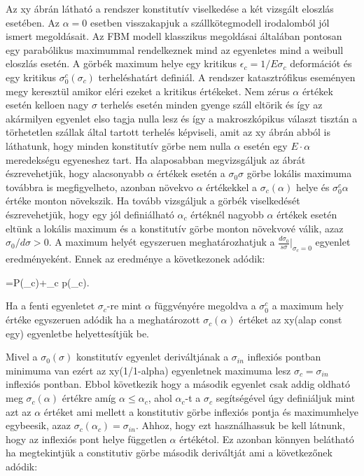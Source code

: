  Az xy ábrán látható a rendszer konstitutív viselkedése a két vizsgált eloszlás esetében. Az $\alpha=0$ esetben visszakapjuk a szállkötegmodell
 irodalomból jól ismert megoldásait. Az FBM modell klasszikus megoldásai általában pontosan egy parabólikus maximummal rendelkeznek mind
 az egyenletes mind a weibull eloszlás esetén. A görbék maximum helye egy kritikus $\epsilon_c=1/E\sigma_c$ deformációt és 
 egy kritikus $\sigma_0^{c}(\sigma_c)$ terheléshatárt definiál. A rendszer katasztrófikus eseményen megy keresztül amikor eléri
 ezeket a kritikus értékeket.
 Nem zérus $\alpha$ értékek esetén kelloen nagy $\sigma$ terhelés esetén minden gyenge száll eltörik és így az akármilyen egyenlet elso tagja 
 nulla lesz és így a makroszkópikus választ tisztán a törhetetlen szállak által tartott terhelés képviseli, amit az xy ábrán
 abból is láthatunk, hogy minden konstitutív görbe nem nulla $\alpha$ esetén egy $E\cdot\alpha$ meredekségu egyeneshez tart.
 Ha alaposabban megvizsgáljuk az ábrát észrevehetjük, hogy alacsonyabb $\alpha$ értékek esetén a $\sigma_0{\sigma}$ görbe lokális maximuma
 továbbra is megfigyelheto, azonban növekvo $\alpha$ értékekkel a $\sigma_c(\alpha)$ helye és $\sigma_0^c{\alpha}$ értéke monton növekszik.
 Ha tovább vizsgáljuk a görbék viselkedését észrevehetjük, hogy egy jól definiálható $\alpha_c$ értéknél nagyobb $\alpha$ értékek
 esetén eltünk a lokális maximum és a konstitutív görbe monton növekvové válik, azaz $\sigma_0/d\sigma>0$. A maximum helyét egyszeruen meghatározhatjuk
 a $\frac{d\sigma_0}{s\sigma}|_{{\sigma_c}=0}$ egyenlet eredményeként. Ennek az eredménye a következonek adódik:

\beq
\label{equ:consti2}
=P(\sigma_c)+\sigma_c p(\sigma_c).
\eeq

 
 Ha a fenti egyenletet $\sigma_c$-re mint $\alpha$ függvényére megoldva a $\sigma_0^c$ a maximum hely értéke egyszeruen adódik ha a meghatározott
 $\sigma_c(\alpha)$ értéket az xy(alap const egy) egyenletbe helyettesítjük be.
 
 Mivel a $\sigma_0(\sigma)$ konstitutív egyenlet deriváltjának a $\sigma_{in}$ inflexiós pontban minimuma van ezért az xy(1/1-alpha) egyenletnek maximuma
 lesz $\sigma_c=\sigma_{in}$ inflexiós pontban. Ebbol következik hogy a második egyenlet csak addig oldható meg $\sigma_c(\alpha)$ értékre
 amíg $\alpha\leq\alpha_c$, ahol $\alpha_c$-t a $\sigma_c$ segítségével úgy definiáljuk mint azt az $\alpha$ értéket ami mellett a konstitutiv görbe
 inflexiós pontja és maximumhelye egybeesik, azaz $\sigma_c(\alpha_c)=\sigma_{in}$. Ahhoz, hogy ezt használhassuk be kell látnunk, hogy az inflexiós pont helye
 független $\alpha$ értékétol. Ez azonban könnyen belátható ha megtekintjük a constitutiv görbe második deriváltját ami a következőnek adódik:
 
